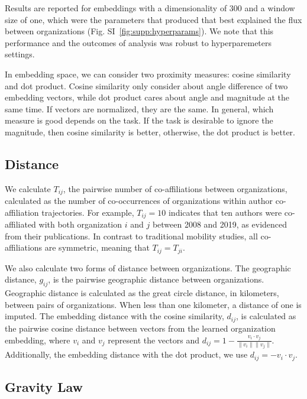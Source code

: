 \documentclass[12pt]{article} %
\begin{document}
Results are reported for embeddings with a dimensionality of 300 and a window size of one, which were the parameters that produced  that best explained the flux between organizations (Fig. SI~\ref{fig:supp:hyperparams}).
We note that this performance and the outcomes of analysis was robust to hyperparemeters settings.

In embedding space, we can consider two proximity measures: cosine similarity and dot product. Cosine similarity only consider about angle difference of two embedding vectors, while dot product cares about angle and magnitude at the same time. If vectors are normalized, they are the same. In general, which measure is good depends on the task. If the task is desirable to ignore the magnitude, then cosine similarity is better, otherwise, the dot product is better.



%
%
\subsection*{Distance}
We calculate $T_{ij}$, the pairwise number of co-affiliations between organizations, calculated as the number of co-occurrences of organizations within author co-affiliation trajectories.
For example, $T_{ij} = 10$ indicates that ten authors were co-affiliated with both organization $i$ and $j$ between 2008 and 2019, as evidenced from their publications.
In contrast to traditional mobility studies, all co-affiliations are symmetric, meaning that $T_{ij} = T_{ji}$.

We also calculate two forms of distance between organizations.
The geographic distance, $g_{ij}$, is the pairwise geographic distance between organizations.
Geographic distance is calculated as the great circle distance, in kilometers, between pairs of organizations.
When less than one kilometer, a distance of one is imputed.
The embedding distance with the cosine similarity, $d_{ij}$, is calculated as the pairwise cosine distance between vectors from the learned organization embedding, where $v_{i}$ and $v_{j}$ represent the vectors and $d_{ij} = 1 - \frac{v_{i} \cdot v_{j}}{\lVert v_{i} \rVert \lVert v_{j} \rVert}$.
Additionally, the embedding distance with the dot product, we use  $d_{ij} =  -v_{i} \cdot v_{j}$.

%
%
\subsection*{Gravity Law}
\end{document}
